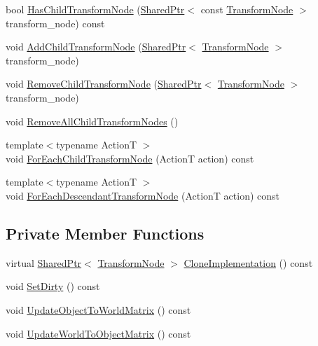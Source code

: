 \begin{DoxyCompactItemize}
\item 
bool \hyperlink{classmage_1_1_transform_node_a372546863845853cd06f2f812b8c85ce}{Has\+Child\+Transform\+Node} (\hyperlink{namespacemage_a1e01ae66713838a7a67d30e44c67703e}{Shared\+Ptr}$<$ const \hyperlink{classmage_1_1_transform_node}{Transform\+Node} $>$ transform\+\_\+node) const
\item 
void \hyperlink{classmage_1_1_transform_node_aae1b47587cbe7315eff368333442ddd6}{Add\+Child\+Transform\+Node} (\hyperlink{namespacemage_a1e01ae66713838a7a67d30e44c67703e}{Shared\+Ptr}$<$ \hyperlink{classmage_1_1_transform_node}{Transform\+Node} $>$ transform\+\_\+node)
\item 
void \hyperlink{classmage_1_1_transform_node_a972043683e57960b331e7f5bc1dc72a6}{Remove\+Child\+Transform\+Node} (\hyperlink{namespacemage_a1e01ae66713838a7a67d30e44c67703e}{Shared\+Ptr}$<$ \hyperlink{classmage_1_1_transform_node}{Transform\+Node} $>$ transform\+\_\+node)
\item 
void \hyperlink{classmage_1_1_transform_node_a95fa10424273f915a13c120dfd33b0cb}{Remove\+All\+Child\+Transform\+Nodes} ()
\item 
{\footnotesize template$<$typename ActionT $>$ }\\void \hyperlink{classmage_1_1_transform_node_ad9c166b58e3718125d2a51827f8d7ca2}{For\+Each\+Child\+Transform\+Node} (ActionT action) const
\item 
{\footnotesize template$<$typename ActionT $>$ }\\void \hyperlink{classmage_1_1_transform_node_a7a052715d9591defa06e494017539711}{For\+Each\+Descendant\+Transform\+Node} (ActionT action) const
\end{DoxyCompactItemize}
\subsection*{Private Member Functions}
\begin{DoxyCompactItemize}
\item 
virtual \hyperlink{namespacemage_a1e01ae66713838a7a67d30e44c67703e}{Shared\+Ptr}$<$ \hyperlink{classmage_1_1_transform_node}{Transform\+Node} $>$ \hyperlink{classmage_1_1_transform_node_a5029922f6e9287e4693334ea156057ba}{Clone\+Implementation} () const
\item 
void \hyperlink{classmage_1_1_transform_node_a333a00b67bde653ffe76b5fa6f240223}{Set\+Dirty} () const
\item 
void \hyperlink{classmage_1_1_transform_node_ac607aac55f3134bf57299d5874c9e9eb}{Update\+Object\+To\+World\+Matrix} () const
\item 
void \hyperlink{classmage_1_1_transform_node_afe8b6b5e882611e1b95bcc61b0db7b5c}{Update\+World\+To\+Object\+Matrix} () const
\end{DoxyCompactItemize}
